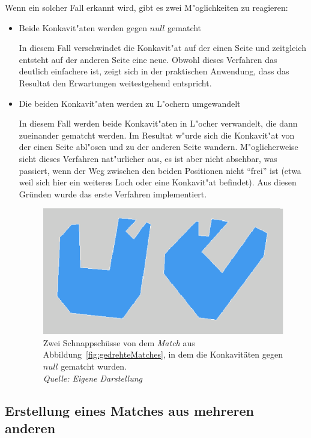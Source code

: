 Wenn ein solcher Fall erkannt wird, gibt es zwei M"oglichkeiten zu reagieren:
\begin{itemize}
\item Beide Konkavit"aten werden gegen $null$ gematcht

In diesem Fall verschwindet die Konkavit"at auf der einen Seite  und zeitgleich entsteht auf der anderen Seite eine neue. Obwohl dieses Verfahren das deutlich einfachere ist, zeigt sich in der praktischen Anwendung, dass das Resultat den Erwartungen weitestgehend entspricht.

\item Die beiden Konkavit"aten werden zu L"ochern umgewandelt

In diesem Fall werden beide Konkavit"aten in L"ocher verwandelt, die dann zueinander gematcht werden. Im Resultat w"urde sich die Konkavit"at von der einen Seite abl"osen und zu der anderen Seite wandern. M"oglicherweise sieht dieses Verfahren nat"urlicher aus, es ist aber nicht absehbar, was passiert, wenn der Weg zwischen den beiden Positionen nicht "`frei"' ist (etwa weil sich hier ein weiteres Loch oder eine Konkavit"at befindet). Aus diesen Gründen wurde das erste Verfahren implementiert.
\begin{figure}
	\centering
	\includegraphics[width=.8 \textwidth]{dreh2.eps}
	\caption[Schnappschüsse von gedrehten Polygonen]{Zwei Schnappschüsse von dem \textit{Match} aus Abbildung~\vref{fig:gedrehteMatches}, in dem die Konkavitäten gegen $null$ gematcht wurden.\\\textit{Quelle: Eigene Darstellung}}
	\label{fig:gedrehteMatches2}
\end{figure}

\end{itemize}


\subsection{Erstellung eines Matches aus mehreren anderen}\label{bewertung}


